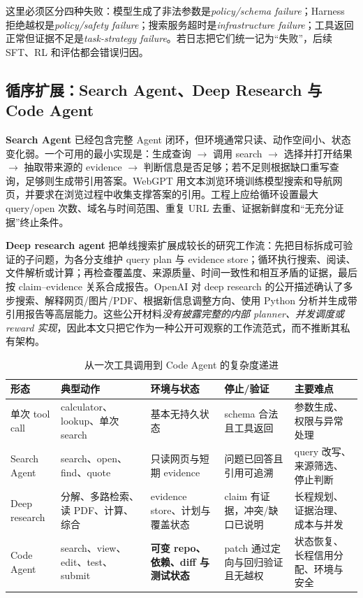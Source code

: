 \documentclass[10pt,a4paper,UTF8,fontset=none]{ctexart}
\begin{document}
这里必须区分四种失败：模型生成了非法参数是\emph{policy/schema failure}；Harness 拒绝越权是\emph{policy/safety failure}；搜索服务超时是\emph{infrastructure failure}；工具返回正常但证据不足是\emph{task-strategy failure}。若日志把它们统一记为“失败”，后续 SFT、RL 和评估都会错误归因。

\subsection{循序扩展：Search Agent、Deep Research 与 Code Agent}

\textbf{Search Agent} 已经包含完整 Agent 闭环，但环境通常只读、动作空间小、状态变化弱。一个可用的最小实现是：生成查询 $\rightarrow$ 调用 search $\rightarrow$ 选择并打开结果 $\rightarrow$ 抽取带来源的 evidence $\rightarrow$ 判断信息是否足够；若不足则根据缺口重写查询，足够则生成带引用答案。WebGPT 用文本浏览环境训练模型搜索和导航网页，并要求在浏览过程中收集支撑答案的引用\cite{zh:nakano2021webgpt}。工程上应给循环设置最大 query/open 次数、域名与时间范围、重复 URL 去重、证据新鲜度和“无充分证据”终止条件。

\textbf{Deep research agent} 把单线搜索扩展成较长的研究工作流：先把目标拆成可验证的子问题，为各分支维护 query plan 与 evidence store；循环执行搜索、阅读、文件解析或计算；再检查覆盖度、来源质量、时间一致性和相互矛盾的证据，最后按 claim--evidence 关系合成报告。OpenAI 对 deep research 的公开描述确认了多步搜索、解释网页/图片/PDF、根据新信息调整方向、使用 Python 分析并生成带引用报告等高层能力\cite{zh:openai2025deepresearch}。这些公开材料\emph{没有披露完整的内部 planner、并发调度或 reward 实现}，因此本文只把它作为一种公开可观察的工作流范式，而不推断其私有架构。

\begin{table}[htbp]
\centering
\caption{从一次工具调用到 Code Agent 的复杂度递进}
\label{zh:tab:agent-progression}
\small
\begin{tabularx}{\textwidth}{p{2.45cm}YYYY}
\toprule
形态 & 典型动作 & 环境与状态 & 停止/验证 & 主要难点 \\
\midrule
单次 tool call & calculator、lookup、单次 search & 基本无持久状态 & schema 合法且工具返回 & 参数生成、权限与异常处理 \\
Search Agent & search、open、find、quote & 只读网页与短期 evidence & 问题已回答且引用可追溯 & query 改写、来源筛选、停止判断 \\
Deep research & 分解、多路检索、读 PDF、计算、综合 & evidence store、计划与覆盖状态 & claim 有证据，冲突/缺口已说明 & 长程规划、证据治理、成本与并发 \\
Code Agent & search、view、edit、test、submit & \textbf{可变 repo、依赖、diff 与测试状态} & patch 通过定向与回归验证且无越权 & 状态恢复、长程信用分配、环境与安全 \\
\bottomrule
\end{tabularx}
\end{table}
\end{document}
